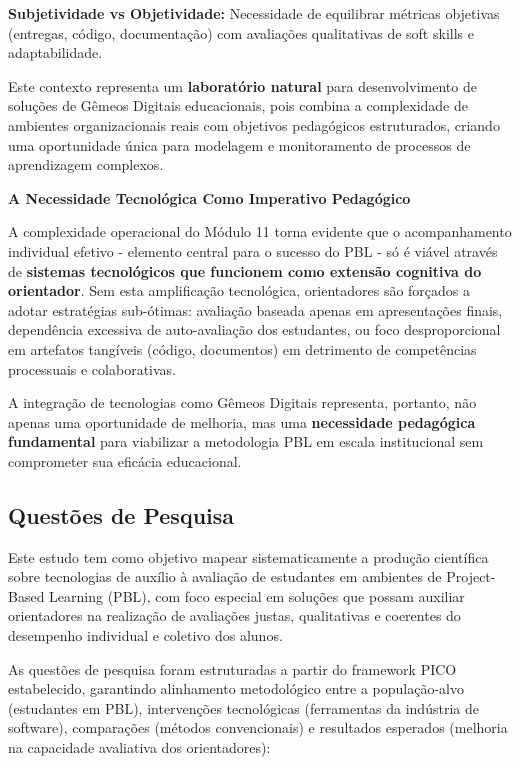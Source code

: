 \documentclass[english, spanish, brazilian]{RBIEarticle} %
\begin{document}
\textbf{Subjetividade vs Objetividade:} Necessidade de equilibrar métricas objetivas (entregas, código, documentação) com avaliações qualitativas de soft skills e adaptabilidade.

Este contexto representa um \textbf{laboratório natural} para desenvolvimento de soluções de Gêmeos Digitais educacionais, pois combina a complexidade de ambientes organizacionais reais com objetivos pedagógicos estruturados, criando uma oportunidade única para modelagem e monitoramento de processos de aprendizagem complexos.

\textbf{A Necessidade Tecnológica Como Imperativo Pedagógico}

A complexidade operacional do Módulo 11 torna evidente que o acompanhamento individual efetivo - elemento central para o sucesso do PBL - só é viável através de \textbf{sistemas tecnológicos que funcionem como extensão cognitiva do orientador}. Sem esta amplificação tecnológica, orientadores são forçados a adotar estratégias sub-ótimas: avaliação baseada apenas em apresentações finais, dependência excessiva de auto-avaliação dos estudantes, ou foco desproporcional em artefatos tangíveis (código, documentos) em detrimento de competências processuais e colaborativas.

A integração de tecnologias como Gêmeos Digitais representa, portanto, não apenas uma oportunidade de melhoria, mas uma \textbf{necessidade pedagógica fundamental} para viabilizar a metodologia PBL em escala institucional sem comprometer sua eficácia educacional.

\subsection{Questões de Pesquisa}

Este estudo tem como objetivo mapear sistematicamente a produção científica sobre tecnologias de auxílio à avaliação de estudantes em ambientes de Project-Based Learning (PBL), com foco especial em soluções que possam auxiliar orientadores na realização de avaliações justas, qualitativas e coerentes do desempenho individual e coletivo dos alunos.

As questões de pesquisa foram estruturadas a partir do framework PICO estabelecido, garantindo alinhamento metodológico entre a população-alvo (estudantes em PBL), intervenções tecnológicas (ferramentas da indústria de software), comparações (métodos convencionais) e resultados esperados (melhoria na capacidade avaliativa dos orientadores):
\end{document}
